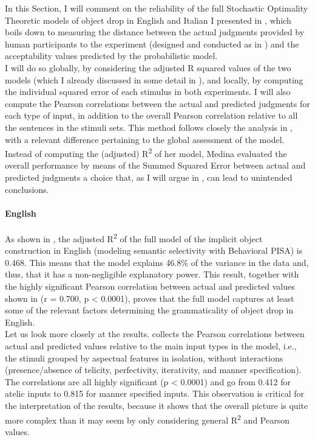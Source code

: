 In this Section, I will comment on the reliability of the full Stochastic Optimality Theoretic models of object drop in English and Italian I presented in , which boils down to measuring the distance between the actual judgments provided by human participants to the experiment (designed and conducted as in ) and the acceptability values predicted by the probabilistic model.\\
I will do so globally, by considering the adjusted R squared values of the two models (which I already discussed in some detail in ), and locally, by computing the individual squared error of each stimulus in both experiments. I will also compute the Pearson correlations between the actual and predicted judgments for each type of input, in addition to the overall Pearson correlation relative to all the sentences in the stimuli sets. This method follows closely the analysis in \textcite[146-154]{Medina2007}, with a relevant difference pertaining to the global assessment of the model. Instead of computing the (adjusted) R\textsuperscript{2} of her model, Medina evaluated the overall performance by means of the Summed Squared Error between actual and predicted judgments \textemdash a choice that, as I will argue in , can lead to unintended conclusions.


\paragraph{English} 
As shown in , the adjusted R\textsuperscript{2} of the full model of the implicit object construction in English (modeling semantic selectivity with Behavioral PISA) is 0.468. This means that the model explains 46.8\% of the variance in the data and, thus, that it has a non-negligible explanatory power. This result, together with the highly significant Pearson correlation between actual and predicted values shown in  (r = 0.700, p < 0.0001), proves that the full model captures at least some of the relevant factors determining the grammaticality of object drop in English.\\
Let us look more closely at the results.  collects the Pearson correlations between actual and predicted values relative to the main input types in the model, i.e., the stimuli grouped by aspectual features in isolation, without interactions (presence/absence of telicity, perfectivity, iterativity, and manner specification). The correlations are all highly significant (p < 0.0001) and go from 0.412 for atelic inputs to 0.815 for manner specified inputs. This observation is critical for the interpretation of the results, because it shows that the overall picture is quite more complex than it may seem by only considering general R\textsuperscript{2} and Pearson values.

